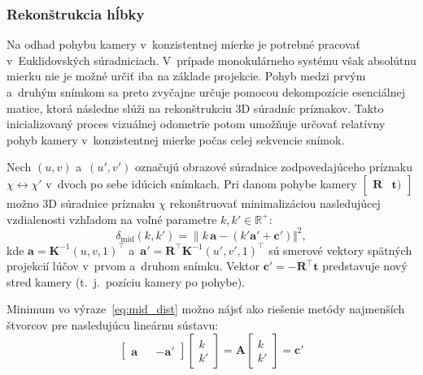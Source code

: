     \subsubsection{Rekonštrukcia hĺbky}
      
      Na odhad pohybu kamery v~konzistentnej mierke je potrebné pracovať v~Euklidovských súradniciach. V~prípade monokulárneho systému však absolútnu mierku nie je možné určiť iba na základe projekcie. Pohyb medzi prvým a~druhým snímkom sa preto zvyčajne určuje pomocou dekompozície esenciálnej matice, ktorá následne slúži na rekonštrukciu 3D súradníc príznakov. Takto inicializovaný proces vizuálnej odometrie potom umožňuje určovať relatívny pohyb kamery v~konzistentnej mierke počas celej sekvencie snímok.

      Nech $(u, v)$ a~$(u', v')$ označujú obrazové súradnice zodpovedajúceho príznaku $\chi \leftrightarrow \chi'$ v~dvoch po sebe idúcich snímkach. Pri danom pohybe kamery $\begin{bmatrix} \mathbf{R} & \mathbf{t}) \end{bmatrix}$ možno 3D súradnice príznaku $\chi$ rekonštruovať minimalizáciou nasledujúcej vzdialenosti vzhľadom na voľné parametre $k, k' \in \mathbb{R}^{+}$:
      \begin{equation}
      \delta_{\text{mid}}(k, k') = {\| k\,\mathbf{a} - (k'\mathbf{a}' + \mathbf{c}') \Vert}^2,
      \label{eq:mid_dist}
      \end{equation}
      kde $\mathbf{a} = \mathbf{K}^{-1}{(u, v, 1)}^{\top}$ a~$\mathbf{a}' = \mathbf{R}^{\top} \mathbf{K}^{-1}{(u', v', 1)}^{\top}$ sú smerové vektory spätných projekcií lúčov v~prvom a~druhom snímku. Vektor $\mathbf{c}' = -\mathbf{R}^{\top} \mathbf{t}$ predstavuje nový stred kamery (t.\ j.\ pozíciu kamery po pohybe).

      Minimum vo výraze~\eqref{eq:mid_dist} možno nájsť ako riešenie metódy najmenších štvorcov pre nasledujúcu lineárnu sústavu:
      \begin{equation}
        \begin{bmatrix}
          \mathbf{a} & & -\mathbf{a}'
        \end{bmatrix} 
        \begin{bmatrix} k~\\ k' \end{bmatrix}
        = \mathbf{A} \begin{bmatrix} k~\\ k' \end{bmatrix} = \mathbf{c}'
        \label{eq:linear_sys}
      \end{equation}

